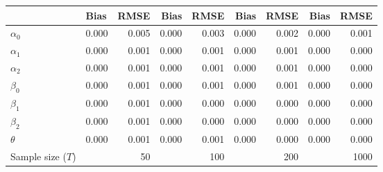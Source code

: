 
\begin{tabular}[t]{llrrrrrrr}
\toprule
  & Bias & RMSE & Bias & RMSE & Bias & RMSE & Bias & RMSE\\
\midrule
$\alpha_{0}$ & 0.000 & 0.005 & 0.000 & 0.003 & 0.000 & 0.002 & 0.000 & 0.001\\
$\alpha_{1}$ & 0.000 & 0.001 & 0.000 & 0.001 & 0.000 & 0.001 & 0.000 & 0.000\\
$\alpha_{2}$ & 0.000 & 0.001 & 0.000 & 0.001 & 0.000 & 0.001 & 0.000 & 0.000\\
$\beta_{0}$ & 0.000 & 0.001 & 0.000 & 0.001 & 0.000 & 0.001 & 0.000 & 0.000\\
$\beta_{1}$ & 0.000 & 0.001 & 0.000 & 0.000 & 0.000 & 0.000 & 0.000 & 0.000\\
$\beta_{2}$ & 0.000 & 0.001 & 0.000 & 0.000 & 0.000 & 0.000 & 0.000 & 0.000\\
$\theta$ & 0.000 & 0.001 & 0.000 & 0.001 & 0.000 & 0.000 & 0.000 & 0.000\\
Sample size ($T$) &  & 50 &  & 100 &  & 200 &  & 1000\\
\bottomrule
\end{tabular}
